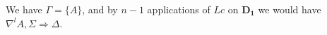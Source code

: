We have $\Gamma = \{ A \}$, and by $n-1$ applications of $Lc$ on $\mathbf{D_1}$ we would have $\nabla^l A , \Sigma \Rightarrow \Delta$.